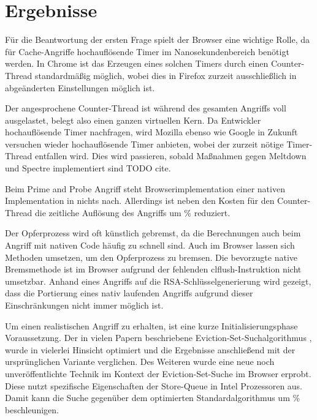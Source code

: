 \section{Ergebnisse}

 Für die Beantwortung der ersten Frage spielt der Browser eine wichtige Rolle, da für Cache-Angriffe hochauflösende Timer im Nanosekundenbereich benötigt werden.
In Chrome ist das Erzeugen eines solchen Timers durch einen Counter-Thread standardmäßig möglich, wobei dies in Firefox zurzeit ausschließlich in abgeänderten Einstellungen möglich ist.

Der angesprochene Counter-Thread ist während des gesamten Angriffs voll ausgelastet, belegt also einen ganzen virtuellen Kern.
Da Entwickler hochauflösende Timer nachfragen, wird Mozilla ebenso wie Google in Zukunft versuchen wieder hochauflösende Timer anbieten, wobei der zurzeit nötige Timer-Thread entfallen wird.
Dies wird passieren, sobald Maßnahmen gegen Meltdown und Spectre implementiert sind TODO cite.

\par\medskip {}

Beim Prime and Probe Angriff steht Browserimplementation einer nativen Implementation in nichts nach. Allerdings ist neben den Kosten für den Counter-Thread die zeitliche Auflösung des Angriffs um  \% reduziert.

Der Opferprozess wird oft künstlich gebremst, da die Berechnungen auch beim Angriff mit nativen Code häufig zu schnell sind.
Auch im Browser lassen sich Methoden umsetzen, um den Opferprozess zu bremsen. 
Die bevorzugte native Bremsmethode ist im Browser aufgrund der fehlenden clflush-Instruktion nicht umsetzbar.
Anhand eines Angriffs auf die RSA-Schlüsselgenerierung wird gezeigt, dass die Portierung eines nativ laufenden Angriffs aufgrund dieser Einschränkungen nicht immer möglich ist.

\par\medskip

Um einen realistischen Angriff zu erhalten, ist eine kurze Initialisierungsphase Voraussetzung.
Der in vielen Papern beschriebene Eviction-Set-Suchalgorithmus \cite{PrimeAndAbort, LiuPrimeAndProbe, DriveByPaper}, wurde in vielerlei Hinsicht optimiert und die Ergebnisse anschließend mit der ursprünglichen Variante verglichen. 
Des Weiteren wurde eine neue noch unveröffentlichte Technik im Kontext der Eviction-Set-Suche im Browser erprobt.
Diese nutzt spezifische Eigenschaften der Store-Queue in Intel Prozessoren aus.
Damit kann die Suche gegenüber dem optimierten Standardalgorithmus um  \% beschleunigen.

